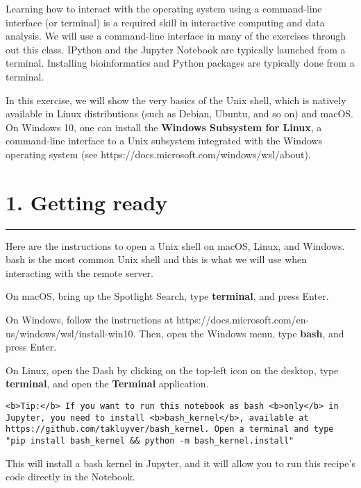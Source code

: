 \documentclass[11pt]{article}
\begin{document}
Learning how to interact with the operating system using a command-line
interface (or terminal) is a required skill in interactive computing and
data analysis. We will use a command-line interface in many of the
exercises through out this class. IPython and the Jupyter Notebook are
typically launched from a terminal. Installing bioinformatics and Python
packages are typically done from a terminal.

In this exercise, we will show the very basics of the Unix shell, which
is natively available in Linux distributions (such as Debian, Ubuntu,
and so on) and macOS. On Windows 10, one can install the \textbf{Windows
Subsystem for Linux}, a command-line interface to a Unix subsystem
integrated with the Windows operating system (see
https://docs.microsoft.com/windows/wsl/about).

    \section{1. Getting ready}\label{getting-ready}

\begin{center}\rule{0.5\linewidth}{\linethickness}\end{center}

Here are the instructions to open a Unix shell on macOS, Linux, and
Windows. bash is the most common Unix shell and this is what we will use
when interacting with the remote server.

On macOS, bring up the Spotlight Search, type \textbf{terminal}, and
press Enter.

On Windows, follow the instructions at
https://docs.microsoft.com/en-us/windows/wsl/install-win10. Then, open
the Windows menu, type \textbf{bash}, and press Enter.

On Linux, open the Dash by clicking on the top-left icon on the desktop,
type \textbf{terminal}, and open the \textbf{Terminal} application.

    \begin{verbatim}
<b>Tip:</b> If you want to run this notebook as bash <b>only</b> in Jupyter, you need to install <b>bash_kernel</b>, available at https://github.com/takluyver/bash_kernel. Open a terminal and type "pip install bash_kernel && python -m bash_kernel.install"
\end{verbatim}

This will install a bash kernel in Jupyter, and it will allow you to run
this recipe's code directly in the Notebook.
\end{document}
